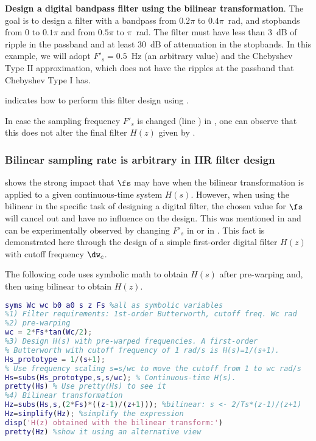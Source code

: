 \bExample \textbf{Design a digital bandpass filter using the bilinear transformation}.
The goal is to design a filter with a bandpass from $0.2\pi$ to $0.4\pi$~rad, and stopbands from 0 to $0.1\pi$ and from $0.5\pi$ to $\pi$~rad.
The filter must have less than 3~dB of ripple in the passband and at least 30~dB of attenuation in the stopbands.
In this example, we will adopt $F'_s=0.5$~Hz (an arbitrary value) and the Chebyshev Type II approximation, which does not have the ripples at the passband that Chebyshev Type I has.

 indicates how to perform this filter design
using \matlab.


In case the sampling frequency $F'_s$ is changed (line ) in , one can observe
that this does not alter the final filter $H(z)$ given by \ci{[Bz, Az]}.
\eExample 

\subsubsection{Bilinear sampling rate is arbitrary in IIR filter design}

 shows the strong impact that $\fs$ may have when the bilinear transformation is applied to a given continuous-time system $H(s)$. However, when using the bilinear in the specific task of designing a digital filter, the chosen value for $\fs$ will cancel out and have no influence on the design. 
This was mentioned in  and can be experimentally observed by changing $F'_s$
in  or in . This fact is demonstrated here
through the design of a simple first-order digital filter $H(z)$ with cutoff frequency $\dw_c$.

The following code uses symbolic math to obtain $H(s)$ after pre-warping and, then using bilinear to obtain $H(z)$.
\begin{lstlisting}[language=Matlab]
%define s, z, natural frequency, damping ratio and sampling interval
syms Wc wc b0 a0 s z Fs %all as symbolic variables
%1) Filter requirements: 1st-order Butterworth, cutoff freq. Wc rad
%2) pre-warping
wc = 2*Fs*tan(Wc/2);
%3) Design H(s) with pre-warped frequencies. A first-order
% Butterworth with cutoff frequency of 1 rad/s is H(s)=1/(s+1).
Hs_prototype = 1/(s+1);
% Use frequency scaling s=s/wc to move the cutoff from 1 to wc rad/s
Hs=subs(Hs_prototype,s,s/wc); % Continuous-time H(s).
pretty(Hs) % Use pretty(Hs) to see it
%4) Bilinear transformation
Hz=subs(Hs,s,(2*Fs)*((z-1)/(z+1))); %bilinear: s <- 2/Ts*(z-1)/(z+1)
Hz=simplify(Hz); %simplify the expression 
disp('H(z) obtained with the bilinear transform:')
pretty(Hz) %show it using an alternative view
\end{lstlisting}

